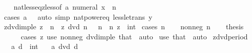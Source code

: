 \begin{isabellebody}
%
\isadelimproof
\ \ %
\endisadelimproof
%
\isatagproof
{}\isamarkupfalse%
\ nat{\isacharunderscore}{\kern0pt}less{\isacharunderscore}{\kern0pt}eq{\isacharunderscore}{\kern0pt}zless{\isacharbrackleft}{\kern0pt}of\ a\ {\isachardoublequoteopen}numeral\ x\ {\isacharcircum}{\kern0pt}\ n{\isachardoublequoteclose}{\isacharbrackright}{\kern0pt}\isanewline
\ \ \isamarkupfalse%
\ {\isacharparenleft}{\kern0pt}cases\ {\isachardoublequoteopen}a\ {\isacharless}{\kern0pt}\ {}{\isachardoublequoteclose}{\isacharparenright}{\kern0pt}\ {\isacharparenleft}{\kern0pt}auto\ simp{\isacharcolon}{\kern0pt}\ nat{\isacharunderscore}{\kern0pt}power{\isacharunderscore}{\kern0pt}eq\ less{\isacharunderscore}{\kern0pt}le{\isacharunderscore}{\kern0pt}trans{\isacharbrackleft}{\kern0pt}\ y{\isacharequal}{\kern0pt}{}{\isacharbrackright}{\kern0pt}{\isacharparenright}{\kern0pt}%
\endisatagproof
{\isafoldproof}%
%
\isadelimproof
\isanewline
%
\endisadelimproof
\isanewline
{}\isamarkupfalse%
\ zdvd{\isacharunderscore}{\kern0pt}imp{\isacharunderscore}{\kern0pt}le{\isacharcolon}{\kern0pt}\ {\isachardoublequoteopen}z\ {\isasymle}\ n{\isachardoublequoteclose}\ \ {\isachardoublequoteopen}z\ dvd\ n{\isachardoublequoteclose}\ {\isachardoublequoteopen}{}\ {\isacharless}{\kern0pt}\ n{\isachardoublequoteclose}\ \ n\ z\ {\isacharcolon}{\kern0pt}{\isacharcolon}{\kern0pt}\ int\isanewline
%
\isadelimproof
%
\endisadelimproof
%
\isatagproof
{}\isamarkupfalse%
\ {\isacharparenleft}{\kern0pt}cases\ n{\isacharparenright}{\kern0pt}\isanewline
\ \ \isamarkupfalse%
\ {\isacharparenleft}{\kern0pt}nonneg\ n{\isacharparenright}{\kern0pt}\isanewline
\ \ \isamarkupfalse%
\ {\isacharquery}{\kern0pt}thesis\isanewline
\ \ \ \ \isamarkupfalse%
\ {\isacharparenleft}{\kern0pt}cases\ z{\isacharparenright}{\kern0pt}\ {\isacharparenleft}{\kern0pt}use\ nonneg\ dvd{\isacharunderscore}{\kern0pt}imp{\isacharunderscore}{\kern0pt}le\ that\ \ auto{\isacharparenright}{\kern0pt}\isanewline
{}\isamarkupfalse%
\ {\isacharparenleft}{\kern0pt}use\ that\ \ auto{\isacharparenright}{\kern0pt}%
\endisatagproof
{\isafoldproof}%
%
\isadelimproof
\isanewline
%
\endisadelimproof
\isanewline
{}\isamarkupfalse%
\ zdvd{\isacharunderscore}{\kern0pt}period{\isacharcolon}{\kern0pt}\isanewline
\ \ \ a\ d\ {\isacharcolon}{\kern0pt}{\isacharcolon}{\kern0pt}\ int\isanewline
\ \ \ {\isachardoublequoteopen}a\ dvd\ d{\isachardoublequoteclose}\isanewline

\end{isabellebody}
